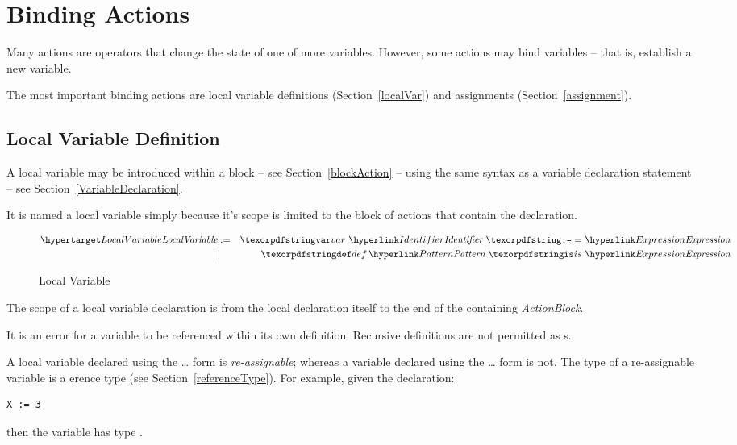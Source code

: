 \section{Binding Actions}
Many actions are operators that change the state of one of more variables. However, some actions may bind variables -- that is, establish a new variable.

The most important binding actions are local variable definitions (Section~\vref{localVar}) and assignments (Section~\vref{assignment}).

\subsection{Local Variable Definition}
\label{localVar}

A local variable may be introduced within a block -- see Section~\vref{blockAction} -- using the same syntax as a variable declaration statement -- see Section~\vref{VariableDeclaration}.
\begin{aside}
It is named a local variable simply because it's scope is limited to the block of actions that contain the declaration.
\end{aside}
\begin{figure}[htbp]
\begin{eqnarray*}
\ntDef{LocalVariable}&\arrow&\q{var}\ \ntRef{Identifier}\ \q{:=}\ \ntRef{Expression}\\
&\choice&\q{def}\,\ntRef{Pattern}\ \q{is}\ \ntRef{Expression}
\end{eqnarray*}
\caption{Local Variable}
\label{localVariableFig}
\end{figure}

The scope of a local variable declaration is from the local declaration itself to the end of the containing \emph{ActionBlock}.

\begin{aside}
It is an error for a variable to be referenced within its own definition. Recursive definitions are not permitted as s.
\end{aside}

A local variable declared using the \ldots\q{:=} form is \emph{re-assignable}; whereas a variable declared using the \ldots{} form is not. The type of a re-assignable variable is a erence type (see Section~\vref{referenceType}). For example, given the  declaration:
\begin{lstlisting}
X := 3
\end{lstlisting}
then the variable  has type .


